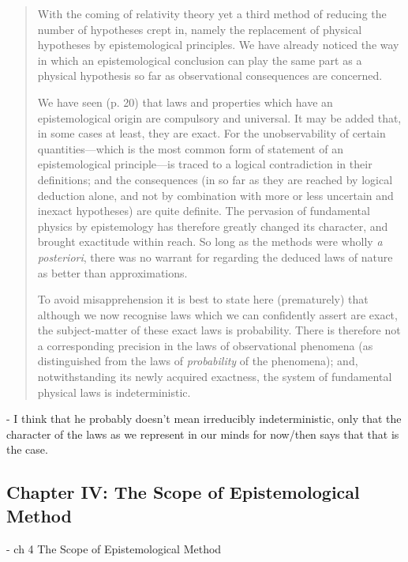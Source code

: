 \begin{quote}
    With the coming of relativity theory yet a third method of reducing the number of hypotheses crept in, namely the replacement of physical hypotheses by epistemological principles.  We have already noticed the way in which an epistemological conclusion can play the same part as a physical hypothesis so far as observational consequences are concerned.  
    
    We have seen (p. 20) that laws and properties which have an epistemological origin are compulsory and universal.  It may be added that, in some cases at least, they are exact.  For the unobservability of certain quantities---which is the most common form of statement of an epistemological principle---is traced to a logical contradiction in their definitions; and the consequences (in so far as they are reached by logical deduction alone, and not by combination with more or less uncertain and inexact hypotheses) are quite definite.  The pervasion of fundamental physics by epistemology has therefore greatly changed its character, and brought exactitude within reach.  So long as the methods were wholly \emph{a posteriori}, there was no warrant for regarding the deduced laws of nature as better than approximations.  
    
    To avoid misapprehension it is best to state here (prematurely) that although we now recognise laws which we can confidently assert are exact, the subject-matter of these exact laws is probability.  There is therefore not a corresponding precision in the laws of observational phenomena (as distinguished from the laws of \emph{probability} of the phenomena); and, notwithstanding its newly acquired exactness, the system of fundamental physical laws is indeterministic.
    
    \citep[p. 45-46]{Eddington1939}
\end{quote}

- I think that he probably doesn't mean irreducibly indeterministic, only that the character of the laws as we represent in our minds for now/then says that that is the case.


\subsection{Chapter IV: The Scope of Epistemological Method}


- ch 4 The Scope of Epistemological Method

